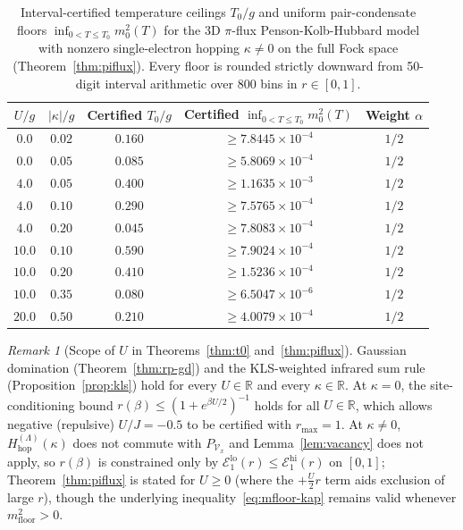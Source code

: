 \documentclass[11pt]{article}
\theoremstyle{definition}
\theoremstyle{remark}
\newtheorem{remark}[theorem]{Remark}
\newcommand{\calV}{\mathcal{V}}
\newcommand{\calE}{\mathcal{E}}
\newcommand{\bbR}{\mathbb{R}}
\begin{document}
\begin{table}[ht]
\centering
\caption{Interval-certified temperature ceilings $T_0/g$ and uniform pair-condensate floors $\inf_{0 < T \le T_0} m_0^2(T)$ for the 3D $\pi$-flux Penson-Kolb-Hubbard model with nonzero single-electron hopping $\kappa \ne 0$ on the full Fock space (Theorem~\ref{thm:piflux}). Every floor is rounded strictly downward from 50-digit interval arithmetic over 800 bins in $r \in [0, 1]$.}\label{tab:piflux-floors}
\begin{tabular}{@{}c c c c c@{}}
\toprule
$U/g$ & $|\kappa|/g$ & Certified $T_0/g$ & Certified $\inf_{0 < T \le T_0} m_0^2(T)$ & Weight $\alpha$ \\
\midrule
$0.0$  & $0.02$ & $0.160$ & $\ge 7.8445 \times 10^{-4}$ & $1/2$ \\
$0.0$  & $0.05$ & $0.085$ & $\ge 5.8069 \times 10^{-4}$ & $1/2$ \\
$4.0$  & $0.05$ & $0.400$ & $\ge 1.1635 \times 10^{-3}$ & $1/2$ \\
$4.0$  & $0.10$ & $0.290$ & $\ge 7.5765 \times 10^{-4}$ & $1/2$ \\
$4.0$  & $0.20$ & $0.045$ & $\ge 7.8083 \times 10^{-4}$ & $1/2$ \\
$10.0$ & $0.10$ & $0.590$ & $\ge 7.9024 \times 10^{-4}$ & $1/2$ \\
$10.0$ & $0.20$ & $0.410$ & $\ge 1.5236 \times 10^{-4}$ & $1/2$ \\
$10.0$ & $0.35$ & $0.080$ & $\ge 6.5047 \times 10^{-6}$ & $1/2$ \\
$20.0$ & $0.50$ & $0.210$ & $\ge 4.0079 \times 10^{-4}$ & $1/2$ \\
\bottomrule
\end{tabular}
\end{table}

\begin{remark}[Scope of $U$ in Theorems~\ref{thm:t0} and~\ref{thm:piflux}]\label{rem:u-scope}
Gaussian domination (Theorem~\ref{thm:rp-gd}) and the KLS-weighted infrared sum rule (Proposition~\ref{prop:kls}) hold for every $U \in \bbR$ and every $\kappa \in \bbR$. At $\kappa = 0$, the site-conditioning bound $r(\beta) \le (1 + e^{\beta U/2})^{-1}$ holds for all $U \in \bbR$, which allows negative (repulsive) $U/J = -0.5$ to be certified with $r_{\max} = 1$. At $\kappa \ne 0$, $H_{\mathrm{hop}}^{(\Lambda)}(\kappa)$ does not commute with $P_{\calV_x}$ and Lemma~\ref{lem:vacancy} does not apply, so $r(\beta)$ is constrained only by $\calE_1^{\mathrm{lo}}(r) \le \calE_1^{\mathrm{hi}}(r)$ on $[0, 1]$; Theorem~\ref{thm:piflux} is stated for $U \ge 0$ (where the $+\frac{U}{2}r$ term aids exclusion of large $r$), though the underlying inequality~\eqref{eq:mfloor-kap} remains valid whenever $m_{\mathrm{floor}}^2 > 0$.
\end{remark}
\end{document}
